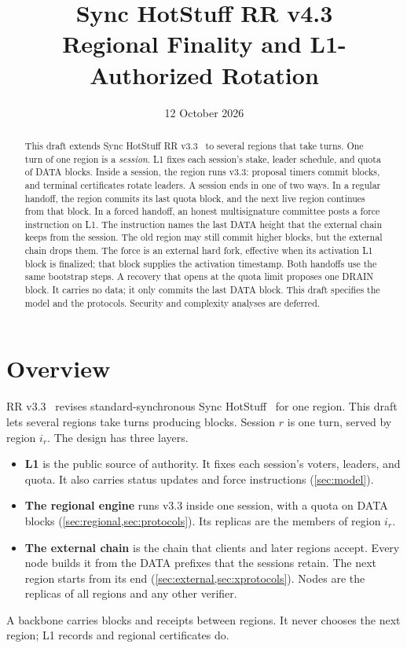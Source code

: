 \documentclass[11pt,a4paper]{article}
\title{Sync HotStuff RR v4.3\\\large Regional Finality and L1-Authorized Rotation}
\author{}\date{12 October 2026}
\newcounter{protocol}
\begin{document}
\maketitle
\begin{abstract}
This draft extends Sync HotStuff RR v3.3~\cite{rr33} to several regions
that take turns. One turn of one region is a \emph{session}. L1 fixes
each session's stake, leader schedule, and quota of DATA blocks. Inside
a session, the region runs v3.3: proposal timers commit blocks, and
terminal certificates rotate leaders. A session ends in one of two ways.
In a regular handoff, the region commits its last quota block, and the
next live region continues from that block. In a forced handoff, an
honest multisignature committee posts a force instruction on L1. The
instruction names the last DATA height that the external chain keeps
from the session. The old region may still commit higher blocks, but
the external chain drops them. The force is an external hard fork,
effective when its activation L1 block is finalized; that block supplies
the activation timestamp. Both handoffs use the same bootstrap
steps. A recovery that opens at the quota limit proposes one DRAIN
block. It carries no data; it only commits the last DATA block. This
draft specifies the model and the protocols. Security and complexity
analyses are deferred.
\end{abstract}

\section{Overview}
\label{sec:overview}
RR v3.3~\cite{rr33} revises standard-synchronous Sync HotStuff~\cite{sync}
for one region. This draft lets several regions take turns producing
blocks. Session $r$ is one turn, served by region $i_r$. The design has
three layers.
\begin{itemize}
\item \textbf{L1} is the public source of authority. It fixes each
session's voters, leaders, and quota. It also carries status updates
and force instructions (\cref{sec:model}).
\item \textbf{The regional engine} runs v3.3 inside one session, with a
quota on DATA blocks (\cref{sec:regional,sec:protocols}). Its replicas
are the members of region $i_r$.
\item \textbf{The external chain} is the chain that clients and later
regions accept. Every node builds it from the DATA prefixes that the
sessions retain. The next region starts from its end
(\cref{sec:external,sec:xprotocols}). Nodes are the replicas of all
regions and any other verifier.
\end{itemize}
A backbone carries blocks and receipts between regions. It never
chooses the next region; L1 records and regional certificates do.
\end{document}
